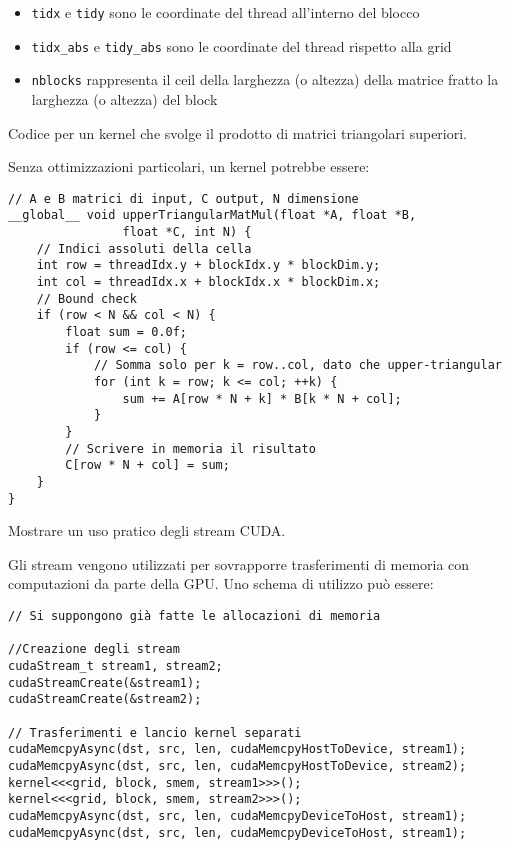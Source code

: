 \begin{questions}
\begin{solution}
\begin{itemize}
            \item \texttt{tidx} e \texttt{tidy} sono le coordinate del thread all'interno del blocco
            
            \item \texttt{tidx\_abs} e \texttt{tidy\_abs} sono le coordinate del thread rispetto alla grid
            
            \item \texttt{nblocks} rappresenta il ceil della larghezza (o altezza) della matrice fratto la larghezza (o altezza) del block
        \end{itemize}
    \end{solution}
    
    \question Codice per un kernel che svolge il prodotto di matrici triangolari superiori.
    
    \begin{solution}
        Senza ottimizzazioni particolari, un kernel potrebbe essere:
        \begin{verbatim}
// A e B matrici di input, C output, N dimensione
__global__ void upperTriangularMatMul(float *A, float *B, 
                float *C, int N) {
    // Indici assoluti della cella
    int row = threadIdx.y + blockIdx.y * blockDim.y;
    int col = threadIdx.x + blockIdx.x * blockDim.x;
    // Bound check
    if (row < N && col < N) {
        float sum = 0.0f;
        if (row <= col) {
            // Somma solo per k = row..col, dato che upper-triangular
            for (int k = row; k <= col; ++k) {
                sum += A[row * N + k] * B[k * N + col];
            }
        }
        // Scrivere in memoria il risultato
        C[row * N + col] = sum;
    }
}
        \end{verbatim} 
    \end{solution}
    
    \question Mostrare un uso pratico degli stream CUDA.
    
    \begin{solution}
        Gli stream vengono utilizzati per sovrapporre trasferimenti di memoria con computazioni da parte della GPU. Uno schema di utilizzo può essere: 
        \begin{verbatim}
// Si suppongono già fatte le allocazioni di memoria

//Creazione degli stream
cudaStream_t stream1, stream2;
cudaStreamCreate(&stream1);
cudaStreamCreate(&stream2);

// Trasferimenti e lancio kernel separati
cudaMemcpyAsync(dst, src, len, cudaMemcpyHostToDevice, stream1);
cudaMemcpyAsync(dst, src, len, cudaMemcpyHostToDevice, stream2);
kernel<<<grid, block, smem, stream1>>>();
kernel<<<grid, block, smem, stream2>>>();
cudaMemcpyAsync(dst, src, len, cudaMemcpyDeviceToHost, stream1);
cudaMemcpyAsync(dst, src, len, cudaMemcpyDeviceToHost, stream1);


\end{verbatim}
\end{solution}
\end{questions}
